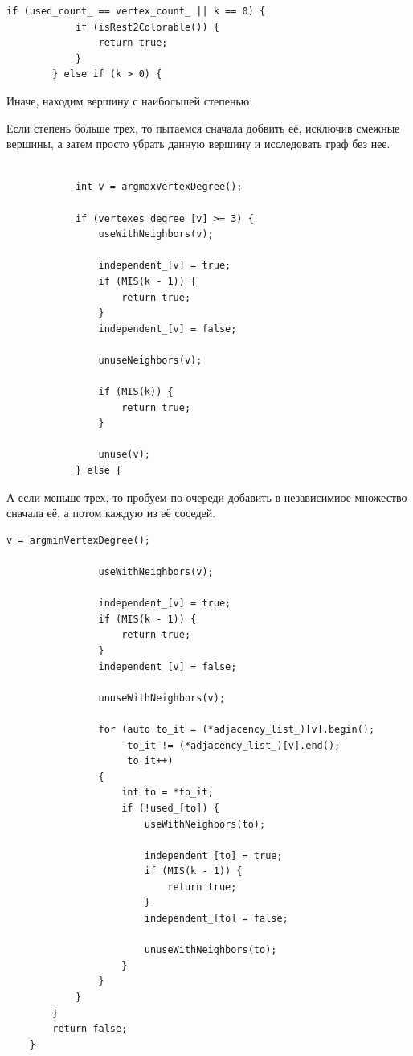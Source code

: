 \documentclass[12pt]{article}
\begin{document}
\begin{lstlisting}[mathescape=true] 
        if (used_count_ == vertex_count_ || k == 0) {
            if (isRest2Colorable()) {
                return true;
            }
        } else if (k > 0) {
\end{lstlisting}

Иначе, находим вершину с наибольшей степенью. 

Если степень больше трех, то пытаемся сначала добвить её, исключив сме\-жные вершины, а затем просто убрать данную вершину и исследовать граф без нее.

\begin{lstlisting}[mathescape=true]        

            int v = argmaxVertexDegree();
    
            if (vertexes_degree_[v] >= 3) {
                useWithNeighbors(v);    
    
                independent_[v] = true;
                if (MIS(k - 1)) {
                    return true;
                }
                independent_[v] = false;
    
                unuseNeighbors(v);
    
                if (MIS(k)) {
                    return true;
                }
                
                unuse(v);
            } else {
\end{lstlisting}

А если меньше трех, то пробуем по-очереди добавить в независимиое мно\-же\-ство сначала её, а потом каждую из её соседей.

\begin{lstlisting}[mathescape=true]            
                v = argminVertexDegree();
    
                useWithNeighbors(v);
    
                independent_[v] = true;
                if (MIS(k - 1)) {
                    return true;
                }
                independent_[v] = false;
    
                unuseWithNeighbors(v);
    
                for (auto to_it = (*adjacency_list_)[v].begin();
                     to_it != (*adjacency_list_)[v].end();
                     to_it++) 
                {
                    int to = *to_it;
                    if (!used_[to]) {
                        useWithNeighbors(to);
    
                        independent_[to] = true;
                        if (MIS(k - 1)) {
                            return true;
                        }
                        independent_[to] = false;
    
                        unuseWithNeighbors(to);
                    }
                }
            }
        }
        return false;
    }
\end{lstlisting}
\end{document}
